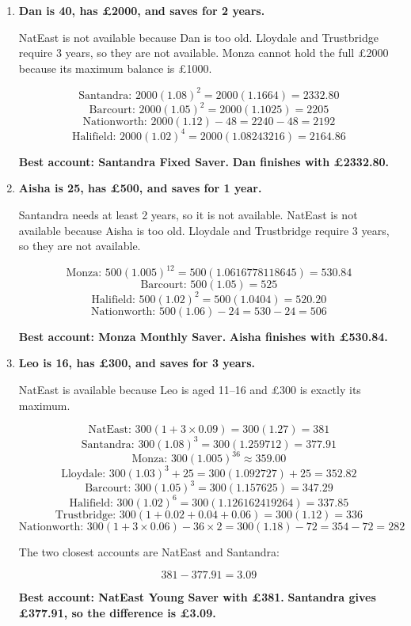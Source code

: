 \documentclass[12pt]{article}
\begin{document}
\begin{enumerate}[label=\textbf{\arabic*.}, leftmargin=4mm, itemsep=6mm, topsep=2mm]
\textbf{Best account: Lloydale Bonus Builder.}  
\textbf{Sofia finishes with \pounds188.91.}

\item \textbf{Dan is 40, has \pounds2000, and saves for 2 years.}

NatEast is not available because Dan is too old.  
Lloydale and Trustbridge require 3 years, so they are not available.  
Monza cannot hold the full \pounds2000 because its maximum balance is \pounds1000.

\[
\text{Santandra: } 2000(1.08)^2=2000(1.1664)=2332.80
\]
\[
\text{Barcourt: } 2000(1.05)^2=2000(1.1025)=2205
\]
\[
\text{Nationworth: } 2000(1.12)-48=2240-48=2192
\]
\[
\text{Halifield: } 2000(1.02)^4=2000(1.08243216)=2164.86
\]

\textbf{Best account: Santandra Fixed Saver.}  
\textbf{Dan finishes with \pounds2332.80.}

\item \textbf{Aisha is 25, has \pounds500, and saves for 1 year.}

Santandra needs at least 2 years, so it is not available.  
NatEast is not available because Aisha is too old.  
Lloydale and Trustbridge require 3 years, so they are not available.

\[
\text{Monza: } 500(1.005)^{12}=500(1.0616778118645)=530.84
\]
\[
\text{Barcourt: } 500(1.05)=525
\]
\[
\text{Halifield: } 500(1.02)^2=500(1.0404)=520.20
\]
\[
\text{Nationworth: } 500(1.06)-24=530-24=506
\]

\textbf{Best account: Monza Monthly Saver.}  
\textbf{Aisha finishes with \pounds530.84.}

\item \textbf{Leo is 16, has \pounds300, and saves for 3 years.}

NatEast is available because Leo is aged 11--16 and \pounds300 is exactly its maximum.

\[
\text{NatEast: } 300(1+3\times0.09)=300(1.27)=381
\]
\[
\text{Santandra: } 300(1.08)^3=300(1.259712)=377.91
\]
\[
\text{Monza: } 300(1.005)^{36}\approx 359.00
\]
\[
\text{Lloydale: } 300(1.03)^3+25=300(1.092727)+25=352.82
\]
\[
\text{Barcourt: } 300(1.05)^3=300(1.157625)=347.29
\]
\[
\text{Halifield: } 300(1.02)^6=300(1.126162419264)=337.85
\]
\[
\text{Trustbridge: } 300(1+0.02+0.04+0.06)=300(1.12)=336
\]
\[
\text{Nationworth: } 300(1+3\times0.06)-36\times2=300(1.18)-72=354-72=282
\]

The two closest accounts are NatEast and Santandra:

\[
381-377.91=3.09
\]

\textbf{Best account: NatEast Young Saver with \pounds381.}  
\textbf{Santandra gives \pounds377.91, so the difference is \pounds3.09.}

\end{enumerate}
\end{document}
